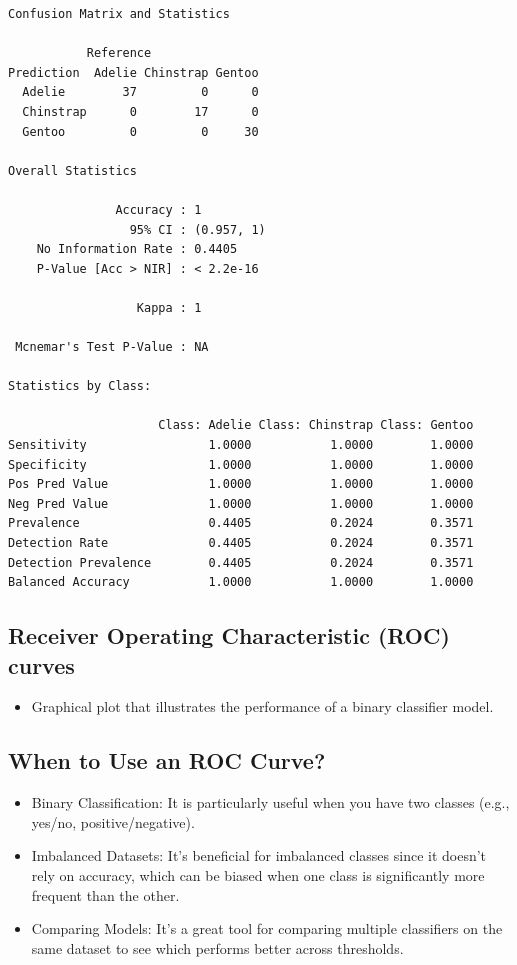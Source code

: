 \documentclass[
  letterpaper,
  DIV=11,
  numbers=noendperiod]{scrreprt}
\providecommand{\tightlist}{%
  \setlength{\itemsep}{0pt}\setlength{\parskip}{0pt}}\usepackage{longtable,booktabs,array}
\begin{document}
\begin{verbatim}
Confusion Matrix and Statistics

           Reference
Prediction  Adelie Chinstrap Gentoo
  Adelie        37         0      0
  Chinstrap      0        17      0
  Gentoo         0         0     30

Overall Statistics
                                    
               Accuracy : 1         
                 95% CI : (0.957, 1)
    No Information Rate : 0.4405    
    P-Value [Acc > NIR] : < 2.2e-16 
                                    
                  Kappa : 1         
                                    
 Mcnemar's Test P-Value : NA        

Statistics by Class:

                     Class: Adelie Class: Chinstrap Class: Gentoo
Sensitivity                 1.0000           1.0000        1.0000
Specificity                 1.0000           1.0000        1.0000
Pos Pred Value              1.0000           1.0000        1.0000
Neg Pred Value              1.0000           1.0000        1.0000
Prevalence                  0.4405           0.2024        0.3571
Detection Rate              0.4405           0.2024        0.3571
Detection Prevalence        0.4405           0.2024        0.3571
Balanced Accuracy           1.0000           1.0000        1.0000
\end{verbatim}

\subsection{Receiver Operating Characteristic (ROC)
curves}\label{receiver-operating-characteristic-roc-curves}

\begin{itemize}
\tightlist
\item
  Graphical plot that illustrates the performance of a binary classifier
  model.
\end{itemize}

\subsection{When to Use an ROC Curve?}\label{when-to-use-an-roc-curve}

\begin{itemize}
\item
  Binary Classification: It is particularly useful when you have two
  classes (e.g., yes/no, positive/negative).
\item
  Imbalanced Datasets: It's beneficial for imbalanced classes since it
  doesn't rely on accuracy, which can be biased when one class is
  significantly more frequent than the other.
\item
  Comparing Models: It's a great tool for comparing multiple classifiers
  on the same dataset to see which performs better across thresholds.
\end{itemize}
\end{document}
